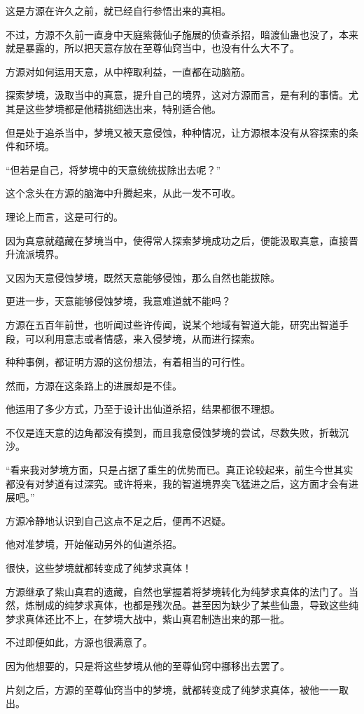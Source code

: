 \begin{this_body}
这是方源在许久之前，就已经自行参悟出来的真相。

不过，方源不久前一直身中天庭紫薇仙子施展的侦查杀招，暗渡仙蛊也没了，本来就是暴露的，所以把天意存放在至尊仙窍当中，也没有什么大不了。

方源对如何运用天意，从中榨取利益，一直都在动脑筋。

探索梦境，汲取当中的真意，提升自己的境界，这对方源而言，是有利的事情。尤其是这些梦境都是他精挑细选出来，特别适合他。

但是处于追杀当中，梦境又被天意侵蚀，种种情况，让方源根本没有从容探索的条件和环境。

“但若是自己，将梦境中的天意统统拔除出去呢？”

这个念头在方源的脑海中升腾起来，从此一发不可收。

理论上而言，这是可行的。

因为真意就蕴藏在梦境当中，使得常人探索梦境成功之后，便能汲取真意，直接晋升流派境界。

又因为天意侵蚀梦境，既然天意能够侵蚀，那么自然也能拔除。

更进一步，天意能够侵蚀梦境，我意难道就不能吗？

方源在五百年前世，也听闻过些许传闻，说某个地域有智道大能，研究出智道手段，可以利用意志或者情感，来入侵梦境，从而进行探索。

种种事例，都证明方源的这份想法，有着相当的可行性。

然而，方源在这条路上的进展却是不佳。

他运用了多少方式，乃至于设计出仙道杀招，结果都很不理想。

不仅是连天意的边角都没有摸到，而且我意侵蚀梦境的尝试，尽数失败，折戟沉沙。

“看来我对梦境方面，只是占据了重生的优势而已。真正论较起来，前生今世其实都没有对梦道有过深究。或许将来，我的智道境界突飞猛进之后，这方面才会有进展吧。”

方源冷静地认识到自己这点不足之后，便再不迟疑。

他对准梦境，开始催动另外的仙道杀招。

很快，这些梦境就都转变成了纯梦求真体！

方源继承了紫山真君的遗藏，自然也掌握着将梦境转化为纯梦求真体的法门了。当然，炼制成的纯梦求真体，也都是残次品。甚至因为缺少了某些仙蛊，导致这些纯梦求真体还比不上，在梦境大战中，紫山真君制造出来的那一批。

不过即便如此，方源也很满意了。

因为他想要的，只是将这些梦境从他的至尊仙窍中挪移出去罢了。

片刻之后，方源的至尊仙窍当中的梦境，就都转变成了纯梦求真体，被他一一取出。


\end{this_body}
